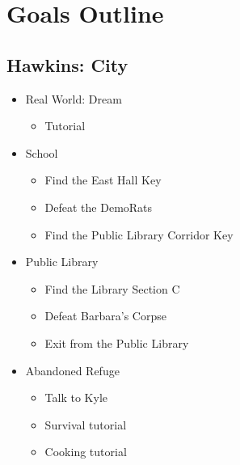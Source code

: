\section{Goals Outline}

\subsection{Hawkins: City}
\begin{itemize}
	\item Real World: Dream
	\begin{itemize}
		\item Tutorial
	\end{itemize}
\end{itemize}
\begin{itemize}
	\item School
	\begin{itemize}
		\item Find the East Hall Key
		\item Defeat the DemoRats
		\item Find the Public Library Corridor Key
	\end{itemize}
	\item Public Library
	\begin{itemize}
		\item Find the Library Section C
		\item Defeat Barbara's Corpse
		\item Exit from the Public Library
	\end{itemize}
	\item Abandoned Refuge
	\begin{itemize}
		\item Talk to Kyle
		\item Survival tutorial
		\item Cooking tutorial
	\end{itemize}
\end{itemize}

